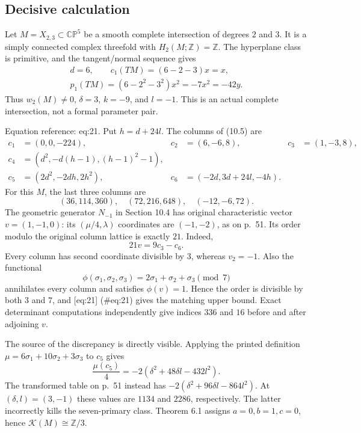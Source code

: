 \documentclass[10pt]{article}
\begin{document}
\subsection*{Decisive calculation}
Let \(M=X_{2,3}\subset\mathbb {CP}^5\) be a smooth complete intersection of degrees \(2\) and \(3\). It is a simply connected complex threefold with \(H_2(M;\mathbb Z)=\mathbb Z\). The hyperplane class is primitive, and the tangent/normal sequence gives \[\begin{gathered}
 d=6,\qquad c_1(TM)=(6-2-3)x=x,\\
 p_1(TM)=(6-2^2-3^2)x^2=-7x^2=-42y .
 \end{gathered}\] Thus \(w_2(M)\ne0\), \(\delta=3\), \(k=-9\), and \(l=-1\). This is an actual complete intersection, not a formal parameter pair.\par
Equation reference: eq:21. Put \(h=d+24l\). The columns of (10.5) are \[\begin{aligned}
 c_1&=(0,0,-224),&c_2&=(6,-6,8),&c_3&=(1,-3,8),\\
 c_4&=(d^2,-d(h-1),(h-1)^2-1),\\
 c_5&=(2d^2,-2dh,2h^2),&
 c_6&=(-2d,3d+24l,-4h).
\end{aligned}\] For this \(M\), the last three columns are \[(36,114,360),\quad (72,216,648),\quad (-12,-6,72).\] The geometric generator \(N_{-1}\) in Section 10.4 has original characteristic vector \(v=(1,-1,0)\): its \((\mu/4,\lambda)\) coordinates are \((-1,-2)\), as on p. 51. Its order modulo the original column lattice is exactly \(21\). Indeed, \[
 21v=9c_3-c_6.\] Every column has second coordinate divisible by \(3\), whereas \(v_2=-1\). Also the functional \[\phi(\sigma_1,\sigma_2,\sigma_3)=2\sigma_1+\sigma_2+\sigma_3\pmod7\] annihilates every column and satisfies \(\phi(v)=1\). Hence the order is divisible by both \(3\) and \(7\), and [eq:21] (\#eq:21) gives the matching upper bound. Exact determinant computations independently give indices \(336\) and \(16\) before and after adjoining \(v\).\par
The source of the discrepancy is directly visible. Applying the printed definition \(\mu=6\sigma_1+10\sigma_2+3\sigma_3\) to \(c_5\) gives \[\frac{\mu(c_5)}4=-2(\delta^2+48\delta l-432l^2).\] The transformed table on p. 51 instead has \(-2(\delta^2+96\delta l-864l^2)\). At \((\delta,l)=(3,-1)\) these values are \(1134\) and \(2286\), respectively. The latter incorrectly kills the seven-primary class. Theorem 6.1 assigns \(a=0,b=1,c=0\), hence \(\mathcal K(M)\cong\mathbb Z/3\).\par
\end{document}

